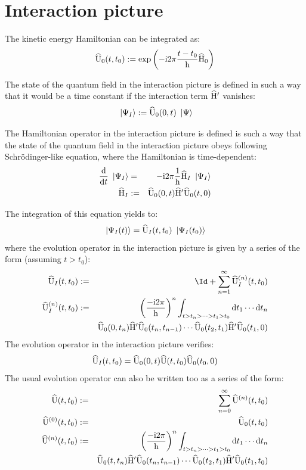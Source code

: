 \documentclass[10pt,a4paper,twoside,openany]{book}
\begin{document}
\section{Interaction picture}

The kinetic energy Hamiltonian can be integrated as:
\begin{equation*}
\widehat{\mathrm U}_0({t},{t_0}) := \mathrm{exp} \left( {- \mathrm{i} 2 \pi \frac{t - t_0} {\mathrm h} \widehat{\mathrm H}_0} \right)
\end{equation*}

The state of the quantum field in the interaction picture is defined in such a way that it would be a time constant if the interaction term $\widehat{\mathrm H}'$ vanishes:
\begin{equation*}
\ \left|{\Psi_I}\right\rangle := \widehat{\mathrm U}_0({0},{t}) \ \left|{\Psi}\right\rangle
\end{equation*}

The Hamiltonian operator in the interaction picture is defined is such a way that the state of the quantum field in the interaction picture obeys following Schrödinger-like equation, where the Hamiltonian is time-dependent:
\begin{eqnarray*}
\frac{\mathrm d}{\mathrm dt} \ \left|{\Psi_I}\right\rangle & = & -\mathrm{i} 2 \pi \frac 1 {\mathrm h} \widehat{\mathrm H}_I \ \left|{\Psi_I}\right\rangle \\
\widehat{\mathrm H}_I & := & \widehat{\mathrm U}_0({0},{t}) \widehat{\mathrm H}' \widehat{\mathrm U}_0({t},{0})
\end{eqnarray*}

The integration of this equation yields to:
\begin{equation*}
\ \left|{\Psi_I(t)}\right\rangle = \widehat{\mathrm U}_I({t},{t_0}) \ \left|{\Psi_I({t_0})}\right\rangle \\
\end{equation*}
where the evolution operator in the interaction picture is given by a series of the form (assuming $t > t_0$):
\begin{eqnarray*}
\UopI t {t_0} & \eqdef & \Id + \sum_{n=1}^\infty \UopIn n t {t_0} \\
\UopIn n t {t_0} & \eqdef & \left( \frac{-\i 2 \pi} \h \right)^n \int_{t > t_n > \dotsb > t_1 > t_0} \dt_1 \dotsm \dt_n \\
&& \UopK 0 {t_n} \Hop' \UopK {t_n} {t_{n-1}} \dotsm \UopK {t_2} {t_1} \Hop' \UopK {t_1} 0
\end{eqnarray*}
The evolution operator in the interaction picture verifies:
\begin{equation*}
\widehat{\mathrm U}_I({t},{t_0}) = \widehat{\mathrm U}_0({0},{t}) \widehat{\mathrm U}({t},{t_0}) \widehat{\mathrm U}_0({t_0},{0})
\end{equation*}
The usual evolution operator can also be written too as a series of the form:
\begin{eqnarray*}
\widehat{\mathrm U}({t},{t_0}) & := & \sum_{n=0}^\infty \widehat{\mathrm U}^{({n})}({t},{t_0}) \\
\widehat{\mathrm U}^{({0})}({t},{t_0}) & := & \widehat{\mathrm U}_0({t},{t_0}) \\
\widehat{\mathrm U}^{({n})}({t},{t_0}) & := & \left( \frac{-\mathrm{i} 2 \pi} {\mathrm h} \right)^n \int_{t > t_n > \dotsb > t_1 > t_0} \mathrm dt_1 \dotsm \mathrm dt_n \\
&& \widehat{\mathrm U}_0({t},{t_n}) \widehat{\mathrm H}' \widehat{\mathrm U}_0({t_n},{t_{n-1}}) \dotsm \widehat{\mathrm U}_0({t_2},{t_1}) \widehat{\mathrm H}' \widehat{\mathrm U}_0({t_1},{t_0})
\end{eqnarray*}
\end{document}
